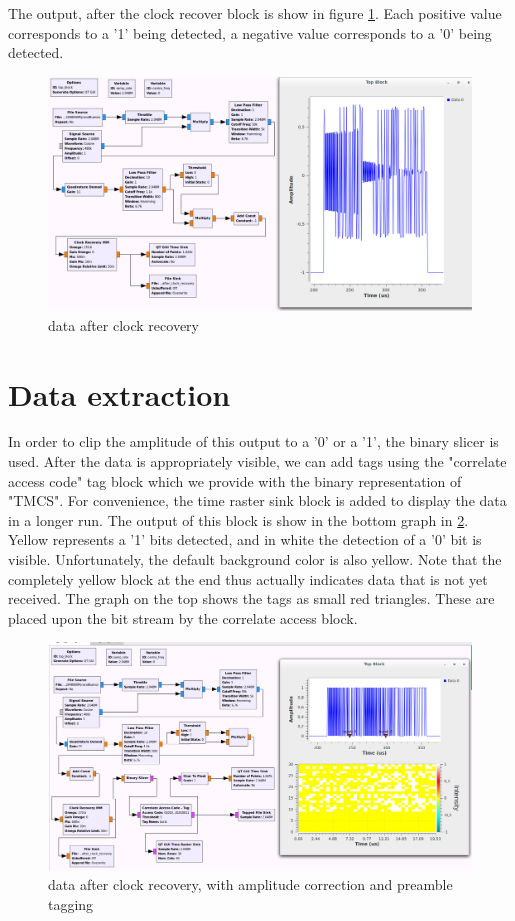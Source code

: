 The output, after the clock recover block is show in figure \ref{fig:after_clock_rec}. Each positive value corresponds to a '1' being detected, a negative value corresponds to a '0' being detected. 

\begin{figure}[h]
\centering
\includegraphics[width=1\linewidth]{figures/after_clock_rec}
\caption[Output after clock recovery]{data after clock recovery }
\label{fig:after_clock_rec}
\end{figure}

\section{Data extraction} 
In order to clip the amplitude of this output to a '0' or a '1', the binary slicer is used. After the data is appropriately visible, we can add tags using the "correlate access code" tag block which we provide with the binary representation of "TMCS". For convenience, the time raster sink block is added to display the data in a longer run. The output of this block is show in the bottom graph in \ref{fig:taggedburst}. Yellow represents a '1' bits detected, and in white the detection of a '0' bit is visible. Unfortunately, the default background color is also yellow. Note that the completely yellow block at the end thus actually indicates data that is not yet received. The graph on the top shows the tags as small red triangles. These are placed upon the bit stream by the correlate access block. 

\begin{figure}[h]
\centering
\includegraphics[width=1\linewidth]{"figures/tagged burst"}
\caption[tagged burst]{data after clock recovery, with amplitude correction and preamble tagging}
\label{fig:taggedburst}
\end{figure}


